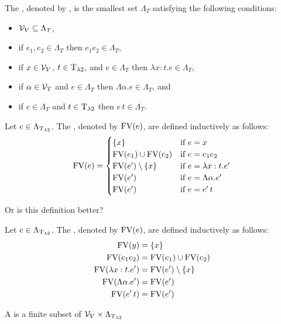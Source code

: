 \begin{definition}
The , denoted by \lambdaTerms{}, is the smallest set $\Lambda_T$ satisfying the following conditions: %
\begin{itemize}
\item $\mathcal{V}_V\subseteq\Lambda_T$,
\item if $e_1,e_2\in\Lambda_T$ then $e_1e_2\in\Lambda_T$,
\item if $x\in\mathcal{V}_V$, $t\in\text{T}_{\lambda2}$, and $e\in\Lambda_T$ then $\lambda x:t.e\in\Lambda_T$,
\item if $\alpha\in\mathcal{V}_T$ and $e\in\Lambda_T$ then $\Lambda \alpha.e\in\Lambda_T$, and
\item if $e\in\Lambda_T$ and $t\in\text{T}_{\lambda2}$ then $e\,t\in\Lambda_T$.
\end{itemize}
\end{definition}
\begin{definition}
Let $e\in\Lambda_{\text{T}_{\lambda2}}$. The , denoted by $\text{FV}(e)$, are defined inductively as follows:
\[\FV(e)=
\begin{cases}
\{x\} & \text{if $e=x$}\\ %
\FV(e_1)\cup\FV(e_2) & \text{if $e=e_1e_2$}\\
\FV(e')\setminus\{x\} & \text{if $e=\lambda x:t.e'$}\\
\FV(e') & \text{if $e=\Lambda\alpha.e'$}\\
\FV(e') & \text{if $e=e'\,t$}\\
\end{cases}\]
\end{definition}
Or is this definition better?
\begin{definition}
Let $e\in\Lambda_{\text{T}_{\lambda2}}$. The , denoted by $\text{FV}(e)$, are defined inductively as follows:
\begin{align*}
\text{FV}(y)&=\{x\}\\
\text{FV}(e_1e_2)&=\text{FV}(e_1)\cup\text{FV}(e_2)\\
\text{FV}(\lambda x:t.e')&=\text{FV}(e')\setminus\{x\}\\
\text{FV}(\Lambda\alpha.e')&=\text{FV}(e')\\
\text{FV}(e'\,t)&=\text{FV}(e')\\
\end{align*}
\end{definition}
\begin{definition} 
A  is a finite subset of $\mathcal{V}_V\times\Lambda_{\text{T}_{\lambda2}}$ %
\end{definition}
